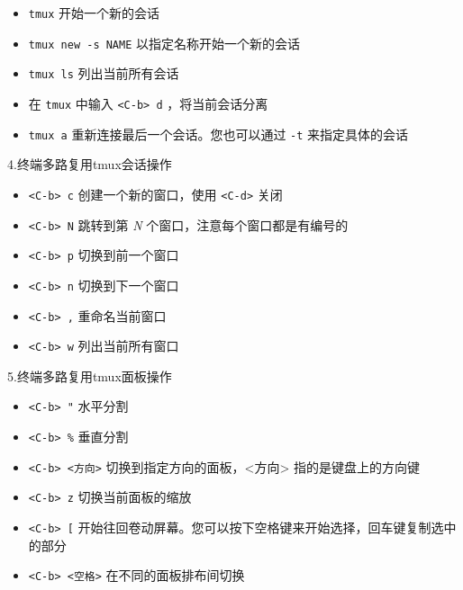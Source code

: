 \documentclass{article}
\begin{document}
   
\begin{itemize}
    \item \verb|tmux| 开始一个新的会话
    \item \verb|tmux new -s NAME| 以指定名称开始一个新的会话
    \item \verb|tmux ls| 列出当前所有会话
    \item 在 \verb|tmux| 中输入 \verb|<C-b> d| ，将当前会话分离
    \item \verb|tmux a| 重新连接最后一个会话。您也可以通过 \verb|-t| 来指定具体的会话
\end{itemize}
   
4.终端多路复用tmux会话操作

\begin{itemize}
    \item \verb|<C-b> c| 创建一个新的窗口，使用 \verb|<C-d>| 关闭
    \item \verb|<C-b> N| 跳转到第 \textit{N} 个窗口，注意每个窗口都是有编号的
    \item \verb|<C-b> p| 切换到前一个窗口
    \item \verb|<C-b> n| 切换到下一个窗口
    \item \verb|<C-b> ,| 重命名当前窗口
    \item \verb|<C-b> w| 列出当前所有窗口
\end{itemize}
 

5.终端多路复用tmux面板操作

\begin{itemize}
    \item \verb|<C-b> "| 水平分割
    \item \verb|<C-b> %| 垂直分割
    \item \verb|<C-b> <方向>| 切换到指定方向的面板，<方向> 指的是键盘上的方向键
    \item \verb|<C-b> z| 切换当前面板的缩放
    \item \verb|<C-b> [| 开始往回卷动屏幕。您可以按下空格键来开始选择，回车键复制选中的部分
    \item \verb|<C-b> <空格>| 在不同的面板排布间切换
\end{itemize}
 
\end{document}

